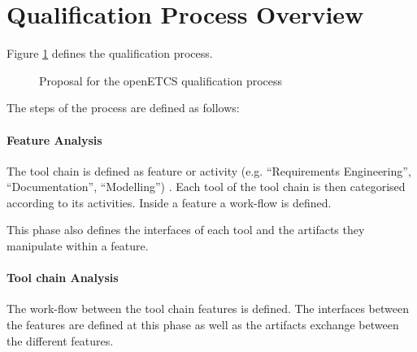 \section{Qualification Process Overview}
\label{sec:process_overview}
Figure \ref{fig:qualification_process} defines the qualification
process.

\begin{figure}[htbp]
\begin{center}
\end{center}
\caption{Proposal for the openETCS qualification process}
\label{fig:qualification_process}
\end{figure}



The steps of the process are defined as follows:

\paragraph{Feature Analysis}
The tool chain is defined as feature or activity (e.g. ``Requirements
Engineering'', ``Documentation'', ``Modelling'') . Each tool of the
tool chain  is then categorised according to its activities. Inside
a feature  a work-flow is defined.

This phase  also defines  the interfaces of each tool and the
artifacts they manipulate within a feature.

\paragraph{Tool chain Analysis}
The work-flow between the tool chain features is defined.
The interfaces between the features are defined at this phase as well as
the artifacts exchange between the different features.

